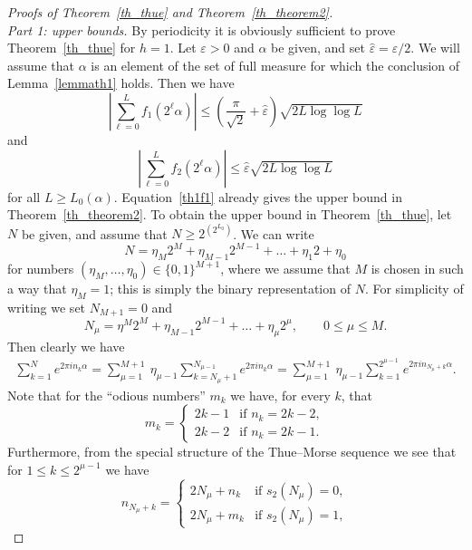 \documentclass[12pt]{amsart}
\newcommand {\ve} {\varepsilon}
\begin{document}
\begin{proof}[Proofs of Theorem~\ref{th_thue} and Theorem~\ref{th_theorem2}]~\\
\emph{Part 1: upper bounds.} \quad By periodicity it is obviously sufficient to prove Theorem~\ref{th_thue} for $h=1$. Let $\ve>0$ and $\alpha$ be given, and set $\hat{\ve} = \ve/2$. We will assume that $\alpha$ is an element of the set of full measure for which the conclusion of Lemma~\ref{lemmath1} holds. Then we have
\begin{equation} \label{th1f1}
\left| \sum_{\ell=0}^{L} f_1(2^\ell \alpha) \right| \leq \left(\frac{\pi}{\sqrt{2}}+\hat{\ve} \right)\sqrt{2 L \log \log L}
\end{equation}
and
\begin{equation} \label{th1f2}
\left| \sum_{\ell=0}^{L} f_2(2^\ell \alpha) \right| \leq \hat{\ve} \sqrt{2 L \log \log L}
\end{equation}
for all $L \geq L_0(\alpha)$. Equation~\eqref{th1f1} already gives the upper bound in Theorem~\ref{th_theorem2}. To obtain the upper bound in Theorem~\ref{th_thue}, let $N$ be given, and assume that $N \geq 2^{(2^{L_0})}$. We can write 
$$
N = \eta_M 2^M + \eta_{M-1} 2^{M-1} + \dots + \eta_1 2 + \eta_0
$$
for numbers $(\eta_M, \dots, \eta_0) \in \{0,1\}^{M+1}$, where we assume that $M$ is chosen in such a way that $\eta_M=1$; this is simply the binary representation of $N$. For simplicity of writing we set $N_{M+1}=0$ and 
$$
N_\mu = \eta^M 2^M + \eta_{M-1} 2^{M-1} + \dots + \eta_{\mu} 2^{\mu}, \qquad 0 \leq \mu \leq M.
$$
Then clearly we have
\begin{eqnarray} \label{sumN}
\sum_{k=1}^N e^{2 \pi i n_k \alpha} = \sum_{\mu=1}^{M+1} ~\eta_{\mu-1} \sum_{k= N_{\mu}+ 1}^{N_{\mu-1}} e^{2 \pi i n_k \alpha} = \sum_{\mu=1}^{M+1} ~\eta_{\mu-1} \sum_{k= 1}^{2^{\mu-1}} e^{2 \pi i n_{N_\mu+k} \alpha}.
\end{eqnarray}
Note that for the ``odious numbers'' $m_k$ we have, for every $k$, that
$$
m_k = \left\{ \begin{array}{ll} 2k-1 & \textrm{if $n_k = 2k-2$},\\ 2k-2 & \textrm{if $n_k=2k-1$.} \end{array} \right.
$$
Furthermore, from the special structure of the Thue--Morse sequence we see that for $1 \leq k \leq 2^{\mu-1}$ we have
\begin{equation} \label{nnmu}
n_{N_{\mu}+k} = \left\{ \begin{array}{ll} 2 N_{\mu} + n_k & \textrm{if $s_2(N_\mu)=0$},\\ 2 N_{\mu} + m_k & \textrm{if $s_2(N_\mu)=1,$}\end{array}\right.

\end{equation}
\end{proof}
\end{document}
